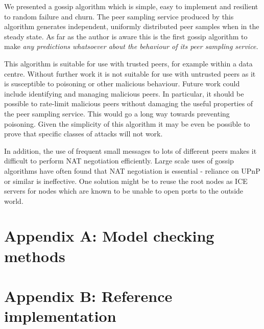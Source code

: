 \documentclass[a4paper,10pt]{article}
\begin{document}
We presented a gossip algorithm which is simple, easy to implement and resilient to random failure and churn. The peer sampling service produced by this algorithm generates independent, uniformly distributed peer samples when in the steady state. As far as the author is aware this is the first gossip algorithm to make \em any \em predictions whatsoever about the behaviour of its peer sampling service.

This algorithm is suitable for use with trusted peers, for example within a data centre. Without further work it is not suitable for use with untrusted peers as it is susceptible to poisoning or other malicious behaviour. Future work could include identifying and managing malicious peers. In particular, it should be possible to rate-limit malicious peers without damaging the useful properties of the peer sampling service. This would go a long way towards preventing poisoning. Given the simplicity of this algorithm it may be even be possible to prove that specific classes of attacks will not work.

In addition, the use of frequent small messages to lots of different peers makes it difficult to perform NAT negotiation efficiently. Large scale uses of gossip algorithms have often found that NAT negotiation is essential - reliance on UPnP or similar is ineffective. One solution might be to reuse the root nodes as ICE servers for nodes which are known to be unable to open ports to the outside world.

\section{Appendix A: Model checking methods}

\section{Appendix B: Reference implementation}

\nocite{*}



\end{document}
